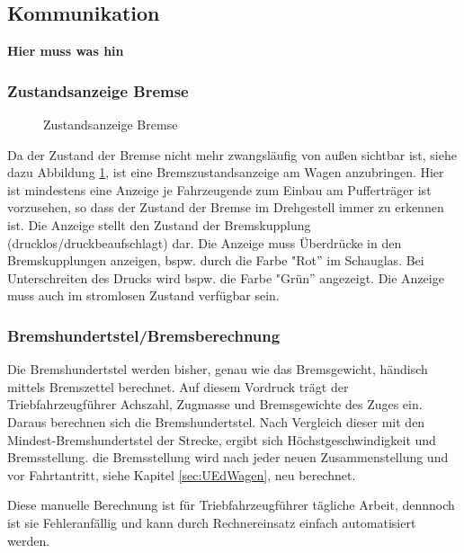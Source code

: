 \subsection{Kommunikation}
\textbf{Hier muss was hin}
\subsubsection{Zustandsanzeige Bremse}
\begin{figure}[htbp]
    \centering
    
    \caption{Zustandsanzeige Bremse \cite{ETR_3}}
    \label{fig:ZustandBremse}
\end{figure} 
Da der Zustand der Bremse nicht mehr zwangsläufig von außen sichtbar ist, siehe dazu Abbildung \ref{fig:ZustandBremse}, ist eine Bremszustandsanzeige am Wagen anzubringen. Hier ist mindestens eine Anzeige je Fahrzeugende zum Einbau am Pufferträger ist vorzusehen, so dass
 der Zustand der Bremse im Drehgestell immer zu erkennen ist. Die Anzeige stellt den Zustand der Bremskupplung (drucklos/druckbeaufschlagt) dar. Die Anzeige muss Überdrücke %
 in den Bremskupplungen anzeigen, bspw. durch die Farbe "Rot'' im Schauglas. Bei Unterschreiten des Drucks wird bspw. die Farbe "Grün'' angezeigt. Die Anzeige muss auch im stromlosen Zustand verfügbar sein.
\subsubsection{Bremshundertstel/Bremsberechnung}
Die Bremshundertstel werden bisher, genau wie das Bremsgewicht, händisch mittels Bremszettel berechnet. Auf diesem Vordruck trägt der Triebfahrzeugführer Achszahl, Zugmasse und Bremsgewichte des Zuges ein. Daraus berechnen sich die Bremshundertstel. Nach Vergleich dieser mit den Mindest-Bremshundertstel der Strecke, ergibt sich Höchstgeschwindigkeit und Bremsstellung. die Bremsstellung wird nach jeder neuen Zusammenstellung und vor Fahrtantritt, siehe Kapitel \ref{sec:UEdWagen}, neu berechnet.\par
Diese manuelle Berechnung ist für Triebfahrzeugführer tägliche Arbeit, dennnoch ist sie Fehleranfällig und kann durch Rechnereinsatz einfach automatisiert werden.
